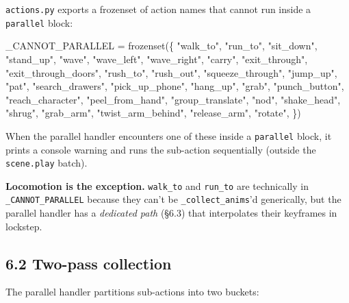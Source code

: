 \documentclass[
  12pt,
  letterpaper,
]{book}
\newenvironment{Shaded}{}{}
\newcommand{\BuiltInTok}[1]{\textcolor[rgb]{0.00,0.50,0.00}{#1}}
\newcommand{\NormalTok}[1]{#1}
\newcommand{\OperatorTok}[1]{\textcolor[rgb]{0.40,0.40,0.40}{#1}}
\newcommand{\StringTok}[1]{\textcolor[rgb]{0.25,0.44,0.63}{#1}}
\begin{document}
\texttt{actions.py} exports a frozenset of action names that cannot run
inside a \texttt{parallel} block:

\begin{Shaded}
\begin{Highlighting}[]
\NormalTok{\_CANNOT\_PARALLEL }\OperatorTok{=} \BuiltInTok{frozenset}\NormalTok{(\{}
    \StringTok{"walk\_to"}\NormalTok{, }\StringTok{"run\_to"}\NormalTok{, }\StringTok{"sit\_down"}\NormalTok{, }\StringTok{"stand\_up"}\NormalTok{, }\StringTok{"wave"}\NormalTok{,}
    \StringTok{"wave\_left"}\NormalTok{, }\StringTok{"wave\_right"}\NormalTok{, }\StringTok{"carry"}\NormalTok{, }\StringTok{"exit\_through"}\NormalTok{,}
    \StringTok{"exit\_through\_doors"}\NormalTok{, }\StringTok{"rush\_to"}\NormalTok{, }\StringTok{"rush\_out"}\NormalTok{, }\StringTok{"squeeze\_through"}\NormalTok{,}
    \StringTok{"jump\_up"}\NormalTok{, }\StringTok{"pat"}\NormalTok{, }\StringTok{"search\_drawers"}\NormalTok{, }\StringTok{"pick\_up\_phone"}\NormalTok{, }\StringTok{"hang\_up"}\NormalTok{,}
    \StringTok{"grab"}\NormalTok{, }\StringTok{"punch\_button"}\NormalTok{, }\StringTok{"reach\_character"}\NormalTok{, }\StringTok{"peel\_from\_hand"}\NormalTok{,}
    \StringTok{"group\_translate"}\NormalTok{, }\StringTok{"nod"}\NormalTok{, }\StringTok{"shake\_head"}\NormalTok{, }\StringTok{"shrug"}\NormalTok{,}
    \StringTok{"grab\_arm"}\NormalTok{, }\StringTok{"twist\_arm\_behind"}\NormalTok{, }\StringTok{"release\_arm"}\NormalTok{, }\StringTok{"rotate"}\NormalTok{,}
\NormalTok{\})}
\end{Highlighting}
\end{Shaded}

When the parallel handler encounters one of these inside a
\texttt{parallel} block, it prints a console warning and runs the
sub-action sequentially (outside the \texttt{scene.play} batch).

\textbf{Locomotion is the exception.} \texttt{walk\_to} and
\texttt{run\_to} are technically in \texttt{\_CANNOT\_PARALLEL} because
they can't be \texttt{\_collect\_anims}'d generically, but the parallel
handler has a \emph{dedicated path} (§6.3) that interpolates their
keyframes in lockstep.

\subsection{6.2 Two-pass collection}\label{two-pass-collection}

The parallel handler partitions sub-actions into two buckets:
\end{document}
